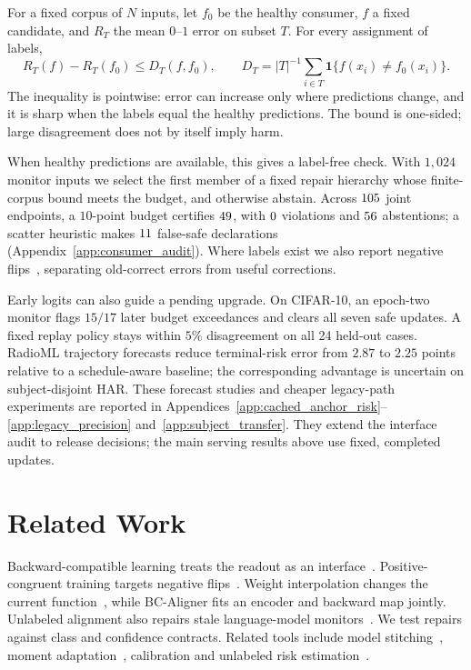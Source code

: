 \documentclass{article}
\begin{document}
For a fixed corpus of $N$ inputs, let $f_0$ be the healthy consumer, $f$ a fixed candidate, and $R_T$ the mean $0$--$1$ error on subset $T$. For every assignment of labels,
\begin{equation}
 R_T(f)-R_T(f_0)\le D_T(f,f_0),\qquad
 D_T=|T|^{-1}\sum_{i\in T}\mathbf1\{f(x_i)\ne f_0(x_i)\}.
 \label{eq:consumer_disagreement}
\end{equation}
The inequality is pointwise: error can increase only where predictions change,
and it is sharp when the labels equal the healthy predictions. The bound is
one-sided; large disagreement does not by itself imply harm.

When healthy predictions are available, this gives a label-free check. With
$1{,}024$ monitor inputs we select the first member of a fixed repair hierarchy
whose finite-corpus bound meets the budget, and otherwise abstain. Across
$105$ joint endpoints, a $10$-point budget certifies
$49$, with $0$ violations and
$56$ abstentions; a scatter heuristic makes
$11$ false-safe declarations
(Appendix~\ref{app:consumer_audit}). Where labels exist we also report negative
flips~\citep{yan2021positive}, separating old-correct errors from useful
corrections.

Early logits can also guide a pending upgrade. On CIFAR-10, an epoch-two
monitor flags $15/17$ later budget exceedances and clears all seven safe
updates. A fixed replay policy stays within $5\%$ disagreement on all
24 held-out cases. RadioML trajectory forecasts reduce terminal-risk error
from $2.87$ to $2.25$ points relative to a schedule-aware baseline;
the corresponding advantage is uncertain on subject-disjoint HAR.
These forecast studies and cheaper legacy-path experiments are reported
in Appendices~\ref{app:cached_anchor_risk}--\ref{app:legacy_precision}
and~\ref{app:subject_transfer}. They extend the interface audit to release
decisions; the main serving results above use fixed, completed updates.

\section{Related Work}\label{sec:related}

Backward-compatible learning treats the readout as an
interface~\citep{shen2020backward,hu2022backward}. Positive-congruent
training targets negative flips~\citep{yan2021positive}. Weight interpolation
changes the current function~\citep{schumann2023bcwi}, while BC-Aligner
fits an encoder and backward map jointly. Unlabeled alignment also repairs
stale language-model monitors~\citep{duan2026staleness}. We test repairs
against class and confidence contracts. Related tools include model
stitching~\citep{bansal2021stitching,mai2026stitching,smith2025functional},
moment adaptation~\citep{li2016adabn,gomezvilla2024ldc,sun2016coral,wang2021tent},
calibration and unlabeled risk estimation~\citep{guo2017calibration,ovadia2019trust,garg2022unlabeled,zhao2023pitfalls}.
\end{document}
